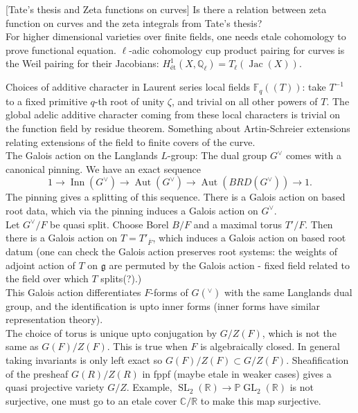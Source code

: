 \documentclass{amsart}
\numberwithin{equation}{section}
\theoremstyle{plain}
\theoremstyle{definition}
\theoremstyle{remark}
\newcommand{\Aut}{\operatorname{Aut}}
\newcommand{\Q}{\mathbb{Q}}
\newcommand{\F}{\mathbb{F}}
\newcommand{\g}{\mathfrak{g}}
\renewcommand{\_}[2]{\underbrace{#1}_{#2}}
\renewcommand{\^}[2]{\overbrace{#1}_{#2}}
\newcommand{\R}{\mathbb{R}}
\renewcommand{\P}{\mathbb{P}}
\newcommand{\C}{\mathbb{C}}
\newcommand{\Inn}{\operatorname{Inn}}
\newcommand{\GL}{\operatorname{GL}}
\newcommand{\SL}{\operatorname{SL}}
\newcommand{\Jac}{\operatorname{Jac}}
\begin{document}
[Tate's thesis and Zeta functions on curves] Is there a relation between zeta function on curves and the zeta integrals from Tate's thesis?\\ For higher dimensional varieties over finite fields, one needs etale cohomology to prove functional equation. $\ell$-adic cohomology cup product pairing for curves is the Weil pairing for their Jacobians: $H^1_{\text{\'et}}(X, \Q_\ell) = T_\ell(\Jac(X))$.

Choices of additive character in Laurent series local fields $\F_q((T))$: take $T^{-1}$ to a fixed primitive $q$-th root of unity $\zeta$, and trivial on all other powers of $T$. The global adelic additive character coming from these local characters is trivial on the function field by residue theorem. Something about Artin-Schreier extensions relating extensions of the field to finite covers of the curve.\\

The Galois action on the Langlands $L$-group: The dual group $G^\vee$ comes with a canonical pinning. We have an exact sequence \[1\to \Inn(G^\vee) \to \Aut (G^\vee) \to \Aut (BRD(G^\vee)) \to 1.\] The pinning gives a splitting of this sequence. There is a Galois action on based root data, which via the pinning induces a Galois action on $G^\vee$. \\
Let $G^\vee/F$ be quasi split. Choose Borel $B/F$ and a maximal torus $T'/F$. Then there is a Galois action on $ T = T'_{\overline F}$, which induces a Galois action on based root datum (one can check the Galois action preserves root systems: the weights of adjoint action of $T$ on $\g$ are permuted by the Galois action - fixed field related to the field over which $T$ splits(?).) \\
This Galois action differentiates $F$-forms of $G(^\vee)$ with the same Langlands dual group, and the identification is upto inner forms (inner forms have similar representation theory).\\ The choice of torus is unique upto conjugation by $G/Z(F)$, which is not the same as $G(F)/Z(F)$. This is true when $F$ is algebraically closed. In general taking invariants is only left exact so $G(F)/Z(F) \subset G/Z(F)$. Sheafification of the presheaf $G(R)/Z(R)$ in fppf (maybe etale in weaker cases) gives a quasi projective variety $G/Z$. Example, $\SL_2(\R) \to \P\GL_2(\R)$ is not surjective, one must go to an  etale cover $\C/\R$ to make this map surjective.
\end{document}
